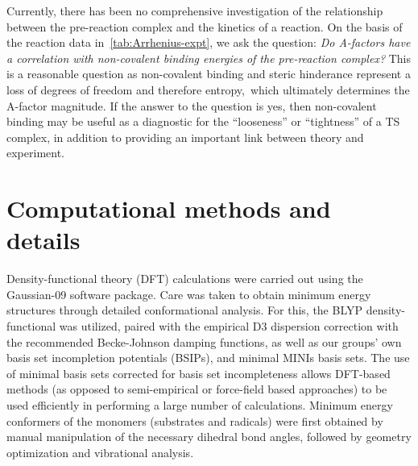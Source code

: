 Currently, there has been no comprehensive investigation of the relationship between the pre-reaction complex and the kinetics of a reaction. On the basis of the reaction data in~\ref{tab:Arrhenius-expt}, we ask the question: \emph{Do A-factors have a correlation with non-covalent binding energies of the pre-reaction complex?} This is a reasonable question as non-covalent binding and steric hinderance represent a loss of degrees of freedom and therefore entropy,\footnotemark\ which ultimately determines the A-factor magnitude. If the answer to the question is yes, then non-covalent binding may be useful as a diagnostic for the ``looseness'' or ``tightness'' of a TS complex, in addition to providing an important link between theory and experiment.


\section{Computational methods and details}

Density-functional theory (DFT) calculations were carried out using the Gaussian-09 software package.\cite{Frisch2009} Care was taken to obtain minimum energy structures through detailed conformational analysis. For this, the BLYP density-functional\cite{Becke1988,Lee1988} was utilized, paired with the empirical D3 dispersion correction\cite{Grimme2010} with the recommended Becke-Johnson damping functions,\cite{Johnson2006} as well as our groups' own basis set incompletion potentials (BSIPs),\cite{OterodelaRoza2017ACP} and minimal MINIs basis sets.\cite{Huzinaga1984} The use of minimal basis sets corrected for basis set incompleteness allows DFT-based methods (as opposed to semi-empirical or force-field based approaches) to be used efficiently in performing a large number of calculations. Minimum energy conformers of the monomers (substrates and radicals) were first obtained by manual manipulation of the necessary dihedral bond angles, followed by geometry optimization and vibrational analysis.

